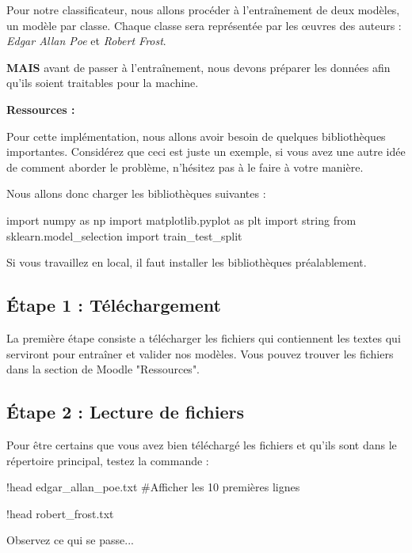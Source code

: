 \vspace{0.5cm}
Pour notre classificateur, nous allons procéder à l’entraînement de deux modèles, un modèle par classe. Chaque classe sera représentée par les œuvres des auteurs : \textit{Edgar Allan Poe} et \textit{Robert Frost}. 

\textbf{MAIS} avant de passer à l'entraînement, nous devons préparer les données afin qu'ils soient traitables pour la machine.

\textbf{Ressources : }

Pour cette implémentation, nous allons avoir besoin de quelques bibliothèques importantes. Considérez que ceci est juste un exemple, si vous avez une autre idée de comment aborder le problème, n’hésitez pas à le faire à votre manière.

Nous allons donc charger les bibliothèques suivantes :

\begin{python}
import numpy as np
import matplotlib.pyplot as plt
import string
from sklearn.model_selection import train_test_split
\end{python}

Si vous travaillez en local, il faut installer les bibliothèques préalablement.

\vspace{0.5cm}

\subsection{Étape 1 : Téléchargement}

La première étape consiste a télécharger les fichiers qui contiennent les textes qui serviront pour entraîner et valider nos modèles. Vous pouvez trouver les fichiers dans la section de Moodle "Ressources".

\subsection{Étape 2 : Lecture de fichiers}

Pour être certains que vous avez bien téléchargé les fichiers et qu'ils sont dans le répertoire principal, testez la commande :

\begin{python} 
!head edgar_allan_poe.txt #Afficher les 10 premières lignes

!head robert_frost.txt
\end{python}

Observez ce qui se passe...


